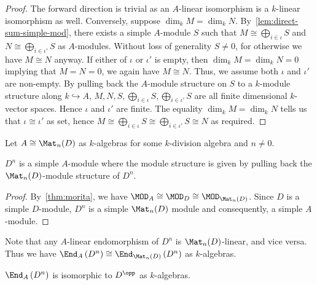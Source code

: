 \begin{proof}
  The forward direction is trivial as an $A$-linear isomorphism is a $k$-linear
  isomorphism as well. Conversely, suppose $\dim_{k}M = \dim_{k}N$.
  By~\cref{lem:direct-sum-simple-mod}, there exists a simple $A$-module $S$ such
  that $M \cong \bigoplus_{i\in\iota} S$ and $N \cong \bigoplus_{i\in\iota'} S$
  as $A$-modules. Without loss of generality $S \ne 0$, for otherwise we have
  $M \cong N$ anyway. If either of $\iota$ or $\iota'$ is empty, then
  $\dim_{k}M = \dim_{k} N = 0$ implying that $M = N = 0$, we again have
  $M \cong N$. Thus, we assume both $\iota$ and $\iota'$ are non-empty. By
  pulling back the $A$-module structure on $S$ to a $k$-module structure along
  $k \hookrightarrow A$,
  $M, N, S, \bigoplus_{i\in\iota} S, \bigoplus_{i\in\iota'} S$ are all finite
  dimensional $k$-vector spaces. Hence $\iota$ and $\iota'$ are finite. The
  equality $\dim_{k}M=\dim_{k}N$ tells us that $\iota \cong \iota'$ as set,
  hence $M \cong \bigoplus_{i\in\iota}S\cong\bigoplus_{i\in\iota'}S\cong N$ as
  required.
\end{proof}

Let $A \cong \Mat_{n}(D)$ as $k$-algebras for some $k$-division algebra and
$n\ne0$.

\begin{lemma}\label{lem:exists-simple-mod}
  $D^{n}$ is a simple $A$-module where the module structure is given by pulling
  back the $\Mat_{n}(D)$-module structure of $D^{n}$.
  \leanok
\end{lemma}
\begin{proof}
  By~\cref{thm:morita}, we have $\MOD_{A}\cong\MOD_{D}\cong\MOD_{\Mat_{n}(D)}$.
  Since $D$ is a simple $D$-module, $D^{n}$ is a simple $\Mat_{n}(D)$ module and
  consequently, a simple $A$-module.
\end{proof}

\begin{remark}
  Note that any $A$-linear endomorphism of $D^{n}$ is $\Mat_{n}(D)$-linear, and
  vice versa. Thus we have
  $\End_{A}\left(D^{n}\right)\cong \End_{\Mat_{n}(D)}\left(D^{n}\right)$ as
  $k$-algebras.
\end{remark}

\begin{lemma}\label{lem:end-vec-iso}
  $\End_{A}\left(D^{n}\right)$ is isomorphic to $D^{\opp}$ as $k$-algebras.
  \leanok
\end{lemma}

